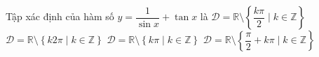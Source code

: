 \begin{ex}%
	Tập xác định của hàm số $y = \dfrac{1}{\sin x} + \tan x$ là
	\choice
	{\True $\mathcal{D} = \mathbb{R} \setminus \left\{\dfrac{k\pi}{2} \mid k \in \mathbb{Z}\right\}$}
	{$\mathcal{D} = \mathbb{R} \setminus \left\{k2\pi \mid k \in \mathbb{Z}\right\}$}
	{$\mathcal{D} = \mathbb{R} \setminus \left\{k\pi \mid k \in \mathbb{Z}\right\}$}
	{$\mathcal{D} = \mathbb{R} \setminus \left\{\dfrac{\pi}{2} + k\pi \mid k \in \mathbb{Z}\right\}$}
\end{ex}


